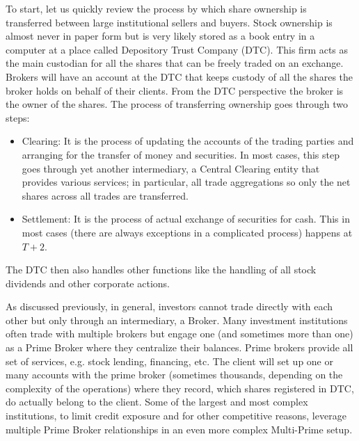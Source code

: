 To start, let us quickly review the process by which share ownership is transferred between large institutional sellers and buyers. Stock ownership is almost never in paper form but is very likely stored as a book entry in a computer at a place called Depository Trust Company (DTC). This firm acts as the main custodian for all the shares that can be freely traded on an exchange. Brokers will have an account at the DTC that keeps custody of all the shares the broker holds on behalf of their clients. From the DTC perspective the broker is the owner of the shares. The process of transferring ownership goes through two steps:
        \begin{itemize}
        \item Clearing: It is the process of updating the accounts of the trading parties and arranging for the transfer of money and securities. In most cases, this step goes through yet another intermediary, a Central Clearing entity that provides various services; in particular, all trade aggregations so only the net shares across all trades are  transferred.
        \item Settlement: It is the process of actual exchange of securities for cash. This in most cases (there are always exceptions in a complicated process) happens at $T+2$.
        \end{itemize}
The DTC then also handles other functions like the handling of all stock dividends and other corporate actions.


As discussed previously, in general, investors cannot trade directly with each other but  only through an intermediary, a Broker. Many investment institutions often trade with multiple brokers but engage one (and sometimes more than one) as a Prime Broker where they centralize their balances. Prime brokers provide all set of services, e.g. stock lending, financing, etc. The client will set up one or many accounts with the prime broker (sometimes thousands, depending on the complexity of the operations) where they record, which shares registered in DTC, do actually belong to the client. Some of the largest and most complex institutions, to limit credit exposure and for other competitive reasons, leverage multiple Prime Broker relationships in an even more complex Multi-Prime setup. 


